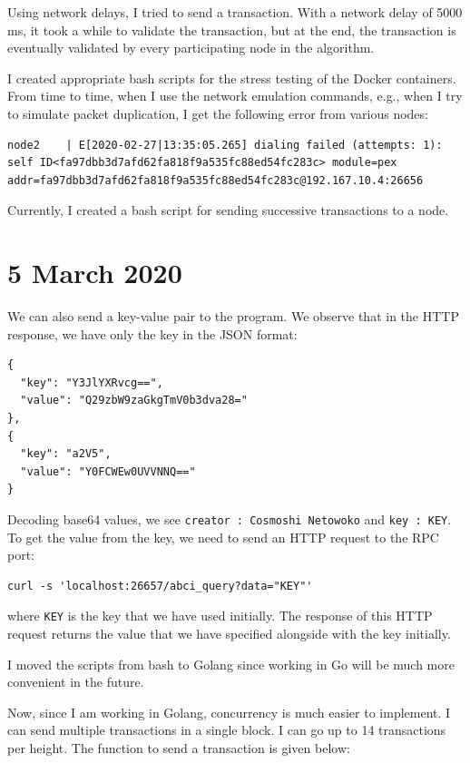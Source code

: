 \documentclass{article}
\begin{document}
Using network delays, I tried to send a transaction. With a network delay of 5000 ms, it took a while to validate the transaction, but at the end, the transaction is eventually validated by every participating node in the algorithm.

I created appropriate bash scripts for the stress testing of the Docker containers.  From time to time, when I use the network emulation commands, e.g., when I try to simulate packet duplication, I get the following error from various nodes:

\begin{lstlisting}
node2    | E[2020-02-27|13:35:05.265] dialing failed (attempts: 1): self ID<fa97dbb3d7afd62fa818f9a535fc88ed54fc283c> module=pex addr=fa97dbb3d7afd62fa818f9a535fc88ed54fc283c@192.167.10.4:26656

\end{lstlisting}

Currently, I created a bash script for sending successive transactions to a node.

\section*{5 March 2020}

We can also send a key-value pair to the program. We observe that in the HTTP response, we have only the key in the JSON format:

\begin{lstlisting}
{
  "key": "Y3JlYXRvcg==",
  "value": "Q29zbW9zaGkgTmV0b3dva28="
},
{
  "key": "a2V5",
  "value": "Y0FCWEw0UVVNNQ=="
}

\end{lstlisting}

Decoding base64 values, we see \texttt{creator : Cosmoshi Netowoko} and \texttt{key : KEY}. To get the value from the key, we need to send an HTTP request to the RPC port:

\begin{lstlisting}
curl -s 'localhost:26657/abci_query?data="KEY"'
\end{lstlisting}
where \texttt{KEY} is the key that we have used initially. The response of this HTTP request returns the value that we have specified alongside with the key initially.

I moved the scripts from bash to Golang since working in Go will be much more convenient in the future.

Now, since I am working in Golang, concurrency is much easier to implement. I can send multiple transactions in a single block. I can go up to 14 transactions per height. The function to send a transaction is given below:
\end{document}
